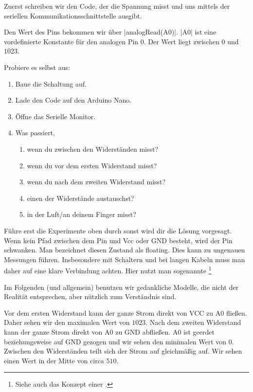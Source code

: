 \documentclass[a4paper,12pt]{book}
\begin{document}
Zuerst schreiben wir den Code, der die Spannung misst und uns mittels der seriellen Kommunikationsschnittstelle ausgibt.

Den Wert des Pins bekommen wir über |analogRead(A0)|.
|A0| ist eine vordefinierte Konstante für den analogen Pin 0.
Der Wert liegt zwischen $0$ und $1023$.

\begin{instruction}
  Probiere es selbst aus:
  \begin{enumerate}
    \item Baue die Schaltung auf.
    \item Lade den Code auf den Arduino Nano.
    \item Öffne das Serielle Monitor.
    \item Was passiert, 
    \begin{enumerate}
      \item wenn du zwischen den Widerständen misst?
      \item wenn du vor dem ersten Widerstand misst?
      \item wenn du nach dem zweiten Widerstand misst?
      \item einen der Widerstände austauschst?
      \item in der Luft/an deinem Finger misst?
    \end{enumerate}
  \end{enumerate}
\end{instruction}

Führe erst die Experimente oben durch sonst wird dir die Lösung vorgesagt.
Wenn kein Pfad zwischen dem Pin und Vcc oder GND besteht, wird der Pin schwanken.
Man bezeichnet diesen Zustand als floating.
Dies kann zu ungenauen Messungen führen. Insbesondere mit Schaltern und bei langen Kabeln 
muss man daher auf eine klare Verbindung achten.
Hier nutzt man sogenannte \footnote{Siehe auch das Konzept einer .}

Im Folgenden (und allgemein) benutzen wir gedankliche Modelle, die nicht der Realität entsprechen, 
aber nützlich zum Verständnis sind.

Vor dem ersten Widerstand kann der ganze Strom direkt von VCC zu A0 fließen.
Daher sehen wir den maximalen Wert von $1023$.
Nach dem zweiten Widerstand kann der ganze Strom direkt von A0 zu GND abfließen.
A0 ist geerdet beziehungsweise auf GND gezogen und wir sehen den minimalen Wert von $0$.
Zwischen den Widerständen teilt sich der Strom auf gleichmäßig auf.
Wir sehen einen Wert in der Mitte von circa $510$.
\end{document}
